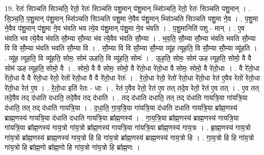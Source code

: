 \documentclass[17pt]{extarticle}
\begin{document}
19. रेतः॑ सिञ्चति सिञ्चति॒ रेतो॒ रेतः॑ सिञ्चति पशु॒मान् प॑शु॒मान् थ्सि॑ञ्चति॒ रेतो॒ रेतः॑ सिञ्चति पशु॒मान् । . सि॒ञ्च॒ति॒ प॒शु॒मान् प॑शु॒मान् थ्सि॑ञ्चति सिञ्चति पशु॒मा ने॒वैव प॑शु॒मान् थ्सि॑ञ्चति सिञ्चति पशु॒मा ने॒व । . प॒शु॒मा ने॒वैव प॑शु॒मान् प॑शु॒मा ने॒व भ॑वति भव त्ये॒व प॑शु॒मान् प॑शु॒मा ने॒व भ॑वति । . प॒शु॒मानिति॑ पशु - मान् । . ए॒व भ॑वति भव त्ये॒वैव भ॑वति सौ॒म्या सौ॒म्या भ॑व त्ये॒वैव भ॑वति सौ॒म्या । . भ॒व॒ति॒ सौ॒म्या सौ॒म्या भ॑वति भवति सौ॒म्या वि वि सौ॒म्या भ॑वति भवति सौ॒म्या वि । . सौ॒म्या वि वि सौ॒म्या सौ॒म्या व्यू॑ह त्यूहति॒ वि सौ॒म्या सौ॒म्या व्यू॑हति । . व्यू॑ह त्यूहति॒ वि व्यू॑हति॒ सोमः॒ सोम॑ ऊहति॒ वि व्यू॑हति॒ सोमः॑ । . ऊ॒ह॒ति॒ सोमः॒ सोम॑ ऊह त्यूहति॒ सोमो॒ वै वै सोम॑ ऊह त्यूहति॒ सोमो॒ वै । . सोमो॒ वै वै सोमः॒ सोमो॒ वै रे॑तो॒धा रे॑तो॒धा वै सोमः॒ सोमो॒ वै रे॑तो॒धाः । . वै रे॑तो॒धा रे॑तो॒धा वै वै रे॑तो॒धा रेतो॒ रेतो॑ रेतो॒धा वै वै रे॑तो॒धा रेतः॑ । . रे॒तो॒धा रेतो॒ रेतो॑ रेतो॒धा रे॑तो॒धा रेत॑ ए॒वैव रेतो॑ रेतो॒धा रे॑तो॒धा रेत॑ ए॒व । . रे॒तो॒धा इति॑ रेतः - धाः । . रेत॑ ए॒वैव रेतो॒ रेत॑ ए॒व तत् तदे॒व रेतो॒ रेत॑ ए॒व तत् । . ए॒व तत् तदे॒वैव तद् द॑धाति दधाति॒ तदे॒वैव तद् द॑धाति । . तद् द॑धाति दधाति॒ तत् तद् द॑धाति गायत्रि॒या गा॑यत्रि॒या द॑धाति॒ तत् तद् द॑धाति गायत्रि॒या । . द॒धा॒ति॒ गा॒य॒त्रि॒या गा॑यत्रि॒या द॑धाति दधाति गायत्रि॒या ब्रा᳚ह्म॒णस्य॑ ब्राह्म॒णस्य॑ गायत्रि॒या द॑धाति दधाति गायत्रि॒या ब्रा᳚ह्म॒णस्य॑ । . गा॒य॒त्रि॒या ब्रा᳚ह्म॒णस्य॑ ब्राह्म॒णस्य॑ गायत्रि॒या गा॑यत्रि॒या ब्रा᳚ह्म॒णस्य॑ गाय॒त्रो गा॑य॒त्रो ब्रा᳚ह्म॒णस्य॑ गायत्रि॒या गा॑यत्रि॒या ब्रा᳚ह्म॒णस्य॑ गाय॒त्रः । . ब्रा॒ह्म॒णस्य॑ गाय॒त्रो गा॑य॒त्रो ब्रा᳚ह्म॒णस्य॑ ब्राह्म॒णस्य॑ गाय॒त्रो हि हि गा॑य॒त्रो ब्रा᳚ह्म॒णस्य॑ ब्राह्म॒णस्य॑ गाय॒त्रो हि । . गा॒य॒त्रो हि हि गा॑य॒त्रो गा॑य॒त्रो हि ब्रा᳚ह्म॒णो ब्रा᳚ह्म॒णो हि गा॑य॒त्रो गा॑य॒त्रो हि ब्रा᳚ह्म॒णः । \newline
\end{document}
